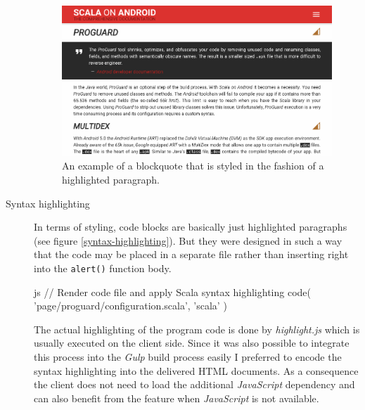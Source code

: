\begin{description}
	\begin{figure}[]
		\includegraphics[width=\textwidth]{asset/blockquote.png}
		\caption{An example of a blockquote that is styled in the fashion of a highlighted paragraph.}
		\label{blockquote}
	\end{figure}

	\item[Syntax highlighting]\hfill

	In terms of styling, code blocks are basically just highlighted paragraphs (see figure \ref{syntax-highlighting}). But they were designed in such a way that the code may be placed in a separate file rather than inserting right into the \texttt{alert()} function body.

	\begin{code}{js}
// Render code file and apply Scala syntax highlighting
code( 'page/proguard/configuration.scala', 'scala' )
	\end{code}

	The actual highlighting of the program code is done by \textit{highlight.js} which is usually executed on the client side. Since it was also possible to integrate this process into the \textit{Gulp} build process easily I preferred to encode the syntax highlighting into the delivered \ac{HTML} documents. As a consequence the client does not need to load the additional \textit{JavaScript} dependency and can also benefit from the feature when \textit{JavaScript} is not available.


\end{description}
